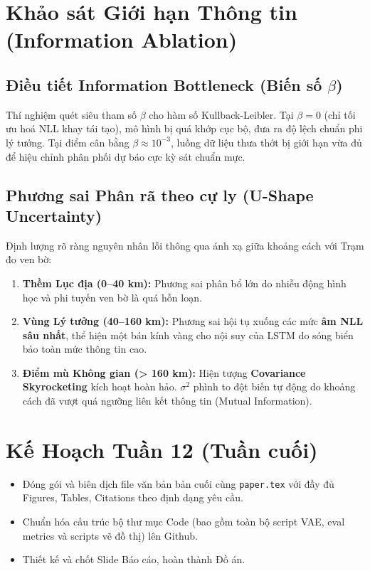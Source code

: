 \documentclass[12pt,a4paper]{article}
\begin{document}
\section{Khảo sát Giới hạn Thông tin (Information Ablation)}

\subsection{Điều tiết Information Bottleneck (Biến số $\beta$)}
Thí nghiệm quét siêu tham số $\beta$ cho hàm số Kullback-Leibler. Tại $\beta=0$ (chỉ tối ưu hoá NLL khay tái tạo), mô hình bị quá khớp cục bộ, đưa ra độ lệch chuẩn phi lý tưởng. Tại điểm cân bằng $\beta \approx 10^{-3}$, luồng dữ liệu thưa thớt bị giới hạn vừa đủ để hiệu chỉnh phân phối dự báo cực kỳ sát chuẩn mực.

\subsection{Phương sai Phân rã theo cự ly (U-Shape Uncertainty)}
Định lượng rõ ràng nguyên nhân lỗi thông qua ánh xạ giữa khoảng cách với Trạm đo ven bờ:
\begin{enumerate}[nosep]
  \item \textbf{Thềm Lục địa (0--40 km):} Phương sai phân bổ lớn do nhiễu động hình học và phi tuyến ven bờ là quá hỗn loạn.
  \item \textbf{Vùng Lý tưởng (40--160 km):} Phương sai hội tụ xuống các mức \textbf{âm NLL sâu nhất}, thể hiện một bán kính vàng cho nội suy của LSTM do sóng biển bảo toàn mức thông tin cao.
  \item \textbf{Điểm mù Không gian (> 160 km):} Hiện tượng \textbf{Covariance Skyrocketing} kích hoạt hoàn hảo. $\sigma^2$ phình to đột biến tự động do khoảng cách đã vượt quá ngưỡng liên kết thông tin (Mutual Information).
\end{enumerate}

\section{Kế Hoạch Tuần 12 (Tuần cuối)}

\begin{itemize}[nosep]
  \item Đóng gói và biên dịch file văn bản bản cuối cùng \texttt{paper.tex} với đầy đủ Figures, Tables, Citations theo định dạng yêu cầu.
  \item Chuẩn hóa cấu trúc bộ thư mục Code (bao gồm toàn bộ script VAE, eval metrics và scripts vẽ đồ thị) lên Github.
  \item Thiết kế và chốt Slide Báo cáo, hoàn thành Đồ án.
\end{itemize}
\end{document}

